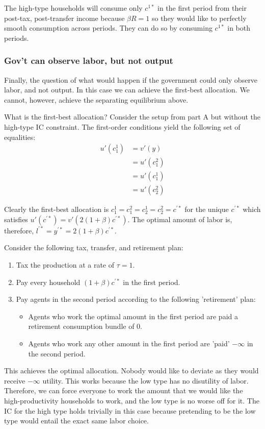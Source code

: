 \documentclass[11pt]{article} %
\begin{document}
The high-type households will consume only $c^{1*}$ in the first period from their post-tax, post-transfer income because $\beta R = 1$ so they would like to perfectly smooth consumption across periods. They can do so by consuming $c^{1*}$ in both periods. 
\subsubsection{Gov't can observe labor, but not output}

Finally, the question of what would happen if the government could only observe labor, and not output. In this case we can achieve the first-best allocation. We cannot, however, achieve the separating equilibrium above. 


What is the first-best allocation? Consider the setup from part A but without the high-type IC constraint. The first-order conditions yield the following set of equalities:
\begin{align*}
u'(c_1^1) &=  v'(y)\\
&= u'(c_1^2)\\
&= u'(c_1^1) \\
&= u'(c_2^2)
\end{align*}

Clearly the first-best allocation is $c_1^1 = c_1^2 = c_2^1 = c_2^2 = c^{'*}$ for the unique $c^{'*}$ which satisfies $u'(c^{'*}) = v'(2(1+\beta)c^{'*})$. The optimal amount of labor is, therefore, $l^{'*} = y^{'*} = 2(1+\beta)c^{'*}$.

Consider the following tax, transfer, and retirement plan:

\begin{enumerate}
\item Tax the production at a rate of $\tau = 1$.
\item Pay every household $(1+\beta)c^{'*}$ in the first period.
\item Pay agents in the second period according to the following 'retirement' plan:
\begin{itemize}
\item Agents who work the optimal amount in the first period are paid a retirement consumption bundle of $0$.
\item Agents who work any other amount in the first period are 'paid' $-\infty$ in the second period.
\end{itemize}
\end{enumerate}

This achieves the optimal allocation. Nobody would like to deviate as they would receive $-\infty$ utility. This works because the low type has no disutility of labor. Therefore, we can force everyone to work the amount that we would like the high-productivity households to work, and the low type is no worse off for it. The IC for the high type holds trivially in this case because pretending to be the low type would entail the exact same labor choice.
\end{document}
